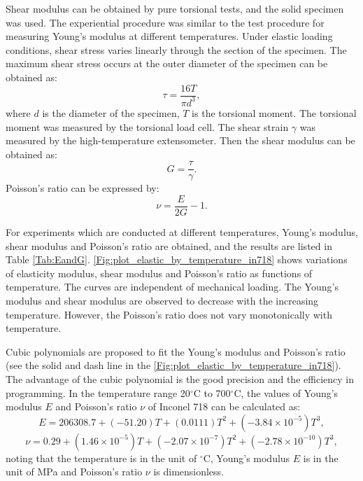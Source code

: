 Shear modulus can be obtained by pure torsional tests, and the solid specimen was used.
The experiential procedure was similar to the test procedure for measuring Young's modulus at different temperatures.
Under elastic loading conditions, shear stress varies linearly through the section of the specimen.
The maximum shear stress occurs at the outer diameter of the specimen can be obtained as:
\begin{equation}
\tau=\frac{{16T}}{\pi d^3},
\end{equation}
where $d$ is the diameter of the specimen, $T$ is the torsional moment.
The torsional moment was measured by the torsional load cell.
The shear strain $\gamma$ was measured by the high-temperature extensometer.
Then the shear modulus can be obtained as:
\begin{equation}
G=\frac{\tau}{\gamma}.
\end{equation}
Poisson's ratio can be expressed by:
\begin{equation}
\nu  = \frac{E}{{2G}} - 1.
\end{equation}

For experiments which are conducted at different temperatures, Young's modulus, shear modulus and Poisson's ratio are obtained, and the results are listed in Table \ref{Tab:EandG}.
\ref{Fig:plot_elastic_by_temperature_in718} shows variations of elasticity modulus, shear modulus and Poisson's ratio as functions of temperature. The curves are independent of mechanical loading. The Young's modulus and shear modulus are observed to decrease with the increasing temperature. However, the Poisson's ratio does not vary monotonically with temperature.

Cubic polynomials are proposed to fit the Young's modulus and Poisson's ratio (see the solid and dash line in the \ref{Fig:plot_elastic_by_temperature_in718}).
The advantage of the cubic polynomial is the good precision and the efficiency in programming.
In the temperature range 20$^{\circ}$C to 700$^{\circ}$C, the values of Young's modulus $E$ and Poisson's ratio $\nu$ of Inconel 718 can be calculated as:
\begin{equation}
E=206308.7+(-51.20)T+(0.0111)T^2+(-3.84\times10^{-5})T^3,
\label{Equ:polynomial_of_E}
\end{equation}
\begin{equation}
\nu=0.29+(1.46\times10^{-5})T+(-2.07\times10^{-7})T^2+(-2.78\times10^{-10})T^3,
\label{Equ:polynomial_of_nu}
\end{equation}
noting that the temperature is in the unit of $^\circ$C, Young's modulus $E$ is in the unit of MPa and Poisson's ratio $\nu$ is dimensionless.

